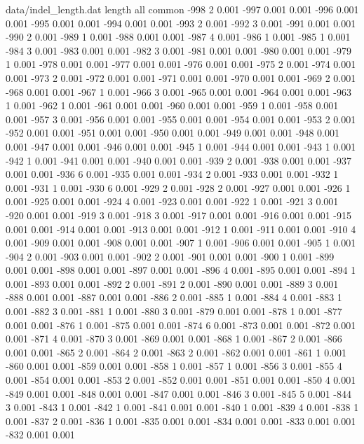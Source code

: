 \begin{filecontents}{data/indel_length.dat}
length	all	common
-998	2	0.001
-997	0.001	0.001
-996	0.001	0.001
-995	0.001	0.001
-994	0.001	0.001
-993	2	0.001
-992	3	0.001
-991	0.001	0.001
-990	2	0.001
-989	1	0.001
-988	0.001	0.001
-987	4	0.001
-986	1	0.001
-985	1	0.001
-984	3	0.001
-983	0.001	0.001
-982	3	0.001
-981	0.001	0.001
-980	0.001	0.001
-979	1	0.001
-978	0.001	0.001
-977	0.001	0.001
-976	0.001	0.001
-975	2	0.001
-974	0.001	0.001
-973	2	0.001
-972	0.001	0.001
-971	0.001	0.001
-970	0.001	0.001
-969	2	0.001
-968	0.001	0.001
-967	1	0.001
-966	3	0.001
-965	0.001	0.001
-964	0.001	0.001
-963	1	0.001
-962	1	0.001
-961	0.001	0.001
-960	0.001	0.001
-959	1	0.001
-958	0.001	0.001
-957	3	0.001
-956	0.001	0.001
-955	0.001	0.001
-954	0.001	0.001
-953	2	0.001
-952	0.001	0.001
-951	0.001	0.001
-950	0.001	0.001
-949	0.001	0.001
-948	0.001	0.001
-947	0.001	0.001
-946	0.001	0.001
-945	1	0.001
-944	0.001	0.001
-943	1	0.001
-942	1	0.001
-941	0.001	0.001
-940	0.001	0.001
-939	2	0.001
-938	0.001	0.001
-937	0.001	0.001
-936	6	0.001
-935	0.001	0.001
-934	2	0.001
-933	0.001	0.001
-932	1	0.001
-931	1	0.001
-930	6	0.001
-929	2	0.001
-928	2	0.001
-927	0.001	0.001
-926	1	0.001
-925	0.001	0.001
-924	4	0.001
-923	0.001	0.001
-922	1	0.001
-921	3	0.001
-920	0.001	0.001
-919	3	0.001
-918	3	0.001
-917	0.001	0.001
-916	0.001	0.001
-915	0.001	0.001
-914	0.001	0.001
-913	0.001	0.001
-912	1	0.001
-911	0.001	0.001
-910	4	0.001
-909	0.001	0.001
-908	0.001	0.001
-907	1	0.001
-906	0.001	0.001
-905	1	0.001
-904	2	0.001
-903	0.001	0.001
-902	2	0.001
-901	0.001	0.001
-900	1	0.001
-899	0.001	0.001
-898	0.001	0.001
-897	0.001	0.001
-896	4	0.001
-895	0.001	0.001
-894	1	0.001
-893	0.001	0.001
-892	2	0.001
-891	2	0.001
-890	0.001	0.001
-889	3	0.001
-888	0.001	0.001
-887	0.001	0.001
-886	2	0.001
-885	1	0.001
-884	4	0.001
-883	1	0.001
-882	3	0.001
-881	1	0.001
-880	3	0.001
-879	0.001	0.001
-878	1	0.001
-877	0.001	0.001
-876	1	0.001
-875	0.001	0.001
-874	6	0.001
-873	0.001	0.001
-872	0.001	0.001
-871	4	0.001
-870	3	0.001
-869	0.001	0.001
-868	1	0.001
-867	2	0.001
-866	0.001	0.001
-865	2	0.001
-864	2	0.001
-863	2	0.001
-862	0.001	0.001
-861	1	0.001
-860	0.001	0.001
-859	0.001	0.001
-858	1	0.001
-857	1	0.001
-856	3	0.001
-855	4	0.001
-854	0.001	0.001
-853	2	0.001
-852	0.001	0.001
-851	0.001	0.001
-850	4	0.001
-849	0.001	0.001
-848	0.001	0.001
-847	0.001	0.001
-846	3	0.001
-845	5	0.001
-844	3	0.001
-843	1	0.001
-842	1	0.001
-841	0.001	0.001
-840	1	0.001
-839	4	0.001
-838	1	0.001
-837	2	0.001
-836	1	0.001
-835	0.001	0.001
-834	0.001	0.001
-833	0.001	0.001
-832	0.001	0.001

\end{filecontents}
